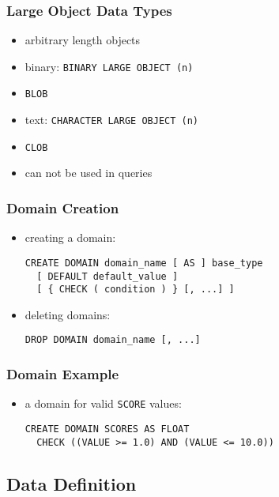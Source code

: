\documentclass[dvipsnames]{beamer}
\theoremstyle{plain}
\begin{document}
\begin{frame}
  \frametitle{Large Object Data Types}

  \begin{itemize}
    \item arbitrary length objects

    \medskip
    \item binary: \texttt{BINARY LARGE OBJECT (n)}
    \item \texttt{BLOB}

    \medskip
    \item text: \texttt{CHARACTER LARGE OBJECT (n)}
    \item \texttt{CLOB}

    \pause
    \medskip
    \item can not be used in queries
  \end{itemize}
\end{frame}

\begin{frame}[fragile]
  \frametitle{Domain Creation}

  \begin{itemize}
    \item creating a domain:
    \begin{lstlisting}
CREATE DOMAIN domain_name [ AS ] base_type
  [ DEFAULT default_value ]
  [ { CHECK ( condition ) } [, ...] ]
    \end{lstlisting}

    \pause
    \item deleting domains:
    \begin{lstlisting}
DROP DOMAIN domain_name [, ...]
    \end{lstlisting}
  \end{itemize}
\end{frame}

\begin{frame}[fragile]
  \frametitle{Domain Example}

  \begin{itemize}
    \item a domain for valid \texttt{SCORE} values:
    \begin{lstlisting}
CREATE DOMAIN SCORES AS FLOAT
  CHECK ((VALUE >= 1.0) AND (VALUE <= 10.0))
    \end{lstlisting}
  \end{itemize}
\end{frame}

\subsection{Data Definition}
\end{document}
